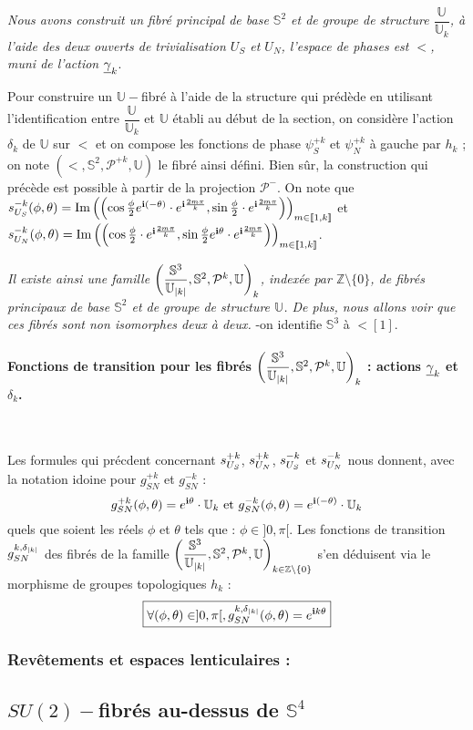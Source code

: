 \etoile
\emph{Nous avons construit un fibr\'e principal de base $\mathbb{S}^2$ et de groupe de structure $\dfrac{\mathbb{U}}{\mathbb{U}_k}$, %
\`a l'aide des deux ouverts de trivialisation $U_S$ et $U_N$, l'espace de phases est $\lt$, muni de l'action $\gk$}.
\par
Pour construire un $\mathbb{U}-$fibr\'e \`a l'aide de la structure qui pr\'ed\`ede en utilisant l'identification entre $\dfrac{\mathbb{U}}{\mathbb{U}_k}$ et $\mathbb{U}$ \'etabli au d\'ebut de la section, %
on consid\`ere l'action $\delta_k$ de $\mathbb{U}$ sur $\lt$ et on compose les fonctions de phase $\psi_S^{+k}$ et $\psi_N^{+k}$ \`a gauche par $h_k$ ; %
on note $\left(\lt ,\mathbb{S}^2,\mathcal{P}^{+k},\mathbb{U}\right)$ le fibr\'e ainsi d\'efini.
\ligneinter
Bien s\^ur, la construction qui pr\'ec\`ede est possible \`a partir de la projection $\mathcal{P}^-$. %
On note que $\se{S}{-k}(\phi,\theta)=\pla{\cos\frac{\phi}{2}\ec{(-\theta)}}{\sin\frac{\phi}{2}}$ et $\se{N}{-k}(\phi,\theta)=\pla{\cos\frac{\phi}{2}}{\sin\frac{\phi}{2}\ec{\theta}}$.
\par
\emph{Il existe ainsi une famille $\left(\lt[\abs{k}],\mathbb{S}^2,\mathcal{P}^k,\mathbb{U}\right)_k$, index\'ee par $\mathbb{Z}\setminus\{0\}$, de fibr\'es principaux de base $\mathbb{S}^2$ et de groupe de structure $\mathbb{U}$. %
De plus, nous allons voir que ces fibr\'es sont \emph{non isomorphes} deux \`a deux.} -on identifie $\mathbb{S}^3$ \`a $\lt[1]$.

\paragraph{Fonctions de transition pour les fibr\'es $\left(\lt[\abs{k}],\mathbb{S}^2,\mathcal{P}^k,\mathbb{U}\right)_k$ : actions $\gk$ et $\delta_k$.}~\\
\par
Les formules qui pr\'ecdent concernant $\se{S}{+k}$, $\se{N}{+k}$, $\se{S}{-k}$ et $\se{N}{-k}$ nous donnent, avec la notation idoine pour $g_{SN}^{+k}$ et $g_{SN}^{-k}$ :
\[g_{SN}^{+k}(\phi ,\theta)=\ec{\theta}\cdot\mathbb{U}_k\text{ et }g_{SN}^{-k}(\phi ,\theta)=\ec{(-\theta)}\cdot\mathbb{U}_k\]
quels que soient les r\'eels $\phi$ et $\theta$ tels que : $\phi\in ]0,\pi[$.
\ligneinter
Les fonctions de transition $g_{SN}^{k,\delta_{\abs{k}}}$ des fibr\'es de la famille $\left(\lt[\abs{k}],\mathbb{S}^2,\mathcal{P}^k,\mathbb{U}\right)_{k\in\mathbb{Z}\setminus\{0\}}$ %
s'en d\'eduisent via le morphisme de groupes topologiques $h_k$ :
\[\boxed{\forall (\phi,\theta)\in ]0,\pi [,g_{SN}^{k,\delta_{\abs{k}}}(\phi,\theta)=\ec{k\theta}}\]

\subsubsection{Rev\^etements et espaces lenticulaires :}

\subsection{$SU(2)-$fibr\'es au-dessus de $\mathbb{S}^4$}



